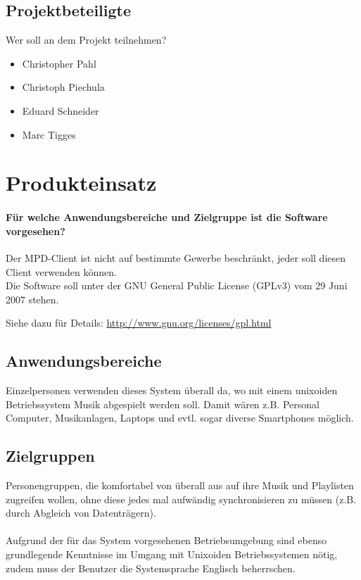 \subsection{Projektbeteiligte}
Wer soll an dem Projekt teilnehmen?
\begin{itemize}
	\item Christopher Pahl
	\item Christoph Piechula
	\item Eduard Schneider
	\item Marc Tigges
\end{itemize}
\section{Produkteinsatz}
\paragraph{Für welche Anwendungsbereiche und Zielgruppe ist die Software vorgesehen?} 
Der MPD-Client ist nicht auf bestimmte Gewerbe beschränkt, jeder soll diesen
Client verwenden können. 
\\
Die Software soll unter der GNU General Public License (GPLv3) vom 29 Juni 2007 stehen.
\begin{center}
    Siehe dazu für Details: \url{http://www.gnu.org/licenses/gpl.html}
\end{center}

\subsection{Anwendungsbereiche}
Einzelpersonen verwenden dieses System überall da, wo mit
einem unixoiden Betriebssystem Musik abgespielt werden soll.
Damit wären z.B. Personal Computer, Musikanlagen, Laptops und evtl.
sogar diverse Smartphones möglich.

\subsection{Zielgruppen}
Personengruppen, die komfortabel von überall aus auf ihre Musik und Playlisten zugreifen
wollen, ohne diese jedes mal aufwändig synchronisieren zu müssen (z.B. durch Abgleich von Datenträgern).\ \\ \\
Aufgrund der für das System vorgesehenen Betriebsumgebung sind ebenso grundlegende Kenntnisse im Umgang mit Unixoiden 
Betriebssystemen nötig, zudem muss der Benutzer die Systemsprache Englisch beherrschen.

